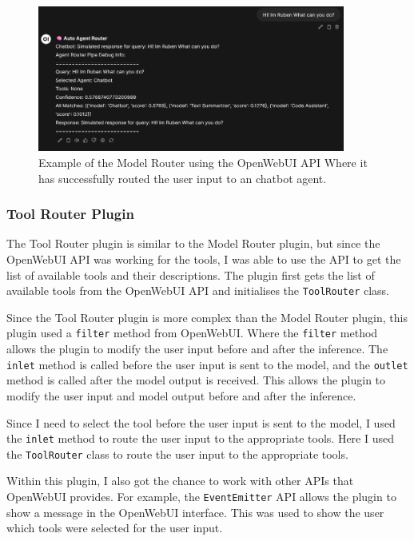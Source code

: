 \begin{figure}[H]
    \centering
    \includegraphics[width=0.9\textwidth]{figures/owui-agent-demo-2.png}
    \caption{Example of the Model Router using the OpenWebUI API Where it has successfully routed the user input to an chatbot agent.}
    \label{fig:model_router_plugin_demo_2}
\end{figure}



\subsubsection{Tool Router Plugin}

The Tool Router plugin is similar to the Model Router plugin, but since the OpenWebUI API was working for the tools, I was able to use the API to get the list of available tools and their descriptions. The plugin first gets the list of available tools from the OpenWebUI API and initialises the \texttt{ToolRouter} class.

Since the Tool Router plugin is more complex than the Model Router plugin, this plugin used a \texttt{filter} method from OpenWebUI. Where the \texttt{filter} method allows the plugin to modify the user input before and after the inference. The \texttt{inlet} method is called before the user input is sent to the model, and the \texttt{outlet} method is called after the model output is received. This allows the plugin to modify the user input and model output before and after the inference.

Since I need to select the tool before the user input is sent to the model, I used the \texttt{inlet} method to route the user input to the appropriate tools. Here I used the \texttt{ToolRouter} class to route the user input to the appropriate tools.

Within this plugin, I also got the chance to work with other APIs that OpenWebUI provides. For example, the \texttt{EventEmitter} API allows the plugin to show a message in the OpenWebUI interface. This was used to show the user which tools were selected for the user input.

